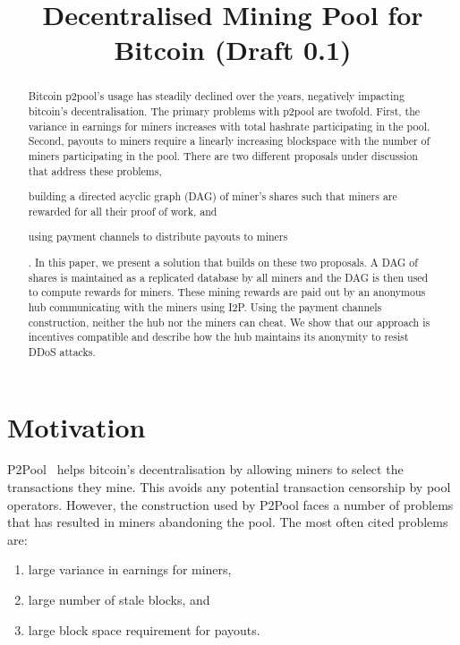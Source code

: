 \documentclass{article}
\title{Decentralised Mining Pool for Bitcoin (Draft 0.1)}
\author{}
\date{}
\begin{document}
\maketitle

\begin{abstract}
  Bitcoin p2pool's usage has steadily declined over the years,
  negatively impacting bitcoin's decentralisation. The primary
  problems with p2pool are twofold. First, the variance in earnings
  for miners increases with total hashrate participating in the
  pool. Second, payouts to miners require a linearly increasing
  blockspace with the number of miners participating in the
  pool. There are two different proposals under discussion that
  address these problems,
  \begin{enumerate*}[label=(\roman*)]
  \item building a directed acyclic graph (DAG) of miner's shares such
    that miners are rewarded for all their proof of work, and
  \item  using payment channels to distribute payouts to miners
  \end{enumerate*}. In this paper, we present a solution that builds
  on these two proposals. A DAG of shares is maintained as a
  replicated database by all miners and the DAG is then used to
  compute rewards for miners. These mining rewards are paid out by an
  anonymous hub communicating with the miners using I2P. Using the
  payment channels construction, neither the hub nor the miners can
  cheat. We show that our approach is incentives compatible and
  describe how the hub maintains its anonymity to resist DDoS attacks.
\end{abstract}
   
\section{Motivation}

P2Pool~\cite{p2pool:wiki} helps bitcoin's decentralisation by allowing
miners to select the transactions they mine. This avoids any potential
transaction censorship by pool operators. However, the construction
used by P2Pool faces a number of problems that has resulted in miners
abandoning the pool. The most often cited problems are:

\begin{enumerate}
\item large variance in earnings for miners,
\item large number of stale blocks, and
\item large block space requirement for payouts.
\end{enumerate}
\end{document}
